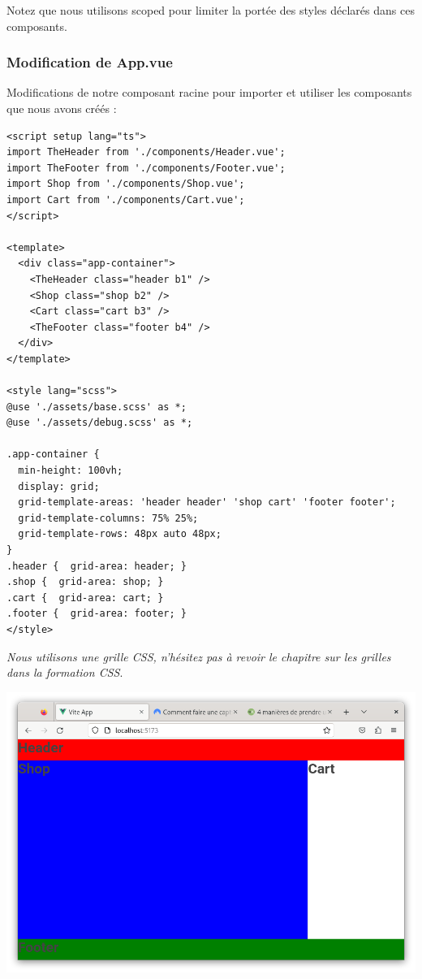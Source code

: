 Notez que nous utilisons {\color{monOrange}scoped} pour limiter la portée des styles déclarés dans ces composants.

\subsubsection{Modification de {\color{monOrange}App.vue}}
Modifications de notre composant racine pour importer et utiliser les composants que nous avons créés :
\begin{verbatim}
<script setup lang="ts">
import TheHeader from './components/Header.vue';
import TheFooter from './components/Footer.vue';
import Shop from './components/Shop.vue';
import Cart from './components/Cart.vue';
</script>

<template>
  <div class="app-container">
    <TheHeader class="header b1" />
    <Shop class="shop b2" />
    <Cart class="cart b3" />
    <TheFooter class="footer b4" />
  </div>
</template>

<style lang="scss">
@use './assets/base.scss' as *;
@use './assets/debug.scss' as *;

.app-container {
  min-height: 100vh;
  display: grid;
  grid-template-areas: 'header header' 'shop cart' 'footer footer';
  grid-template-columns: 75% 25%;
  grid-template-rows: 48px auto 48px;
}
.header {  grid-area: header; }
.shop {  grid-area: shop; }
.cart {  grid-area: cart; }
.footer {  grid-area: footer; }
</style>
\end{verbatim}

{\em Nous utilisons une grille {\color{monOrange}CSS}, n'hésitez pas à revoir le chapitre sur les grilles dans la formation {\color{monOrange}CSS}}.

\begin{center}
\includegraphics[width=15cm]{images/image15.png}
\end{center}

